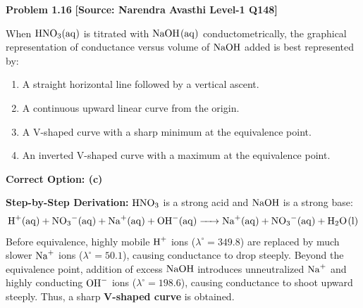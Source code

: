 \begin{problembox}
\textbf{Problem 1.16} \hfill \textbf{[Source: Narendra Avasthi Level-1 Q148]}

When $\ce{HNO3(aq)}$ is titrated with $\ce{NaOH(aq)}$ conductometrically, the graphical representation of conductance versus volume of $\ce{NaOH}$ added is best represented by:
\begin{enumerate}[label=(\alph*)]
    \item A straight horizontal line followed by a vertical ascent.
    \item A continuous upward linear curve from the origin.
    \item A V-shaped curve with a sharp minimum at the equivalence point.
    \item An inverted V-shaped curve with a maximum at the equivalence point.
\end{enumerate}
\end{problembox}
\begin{solution}
\textbf{Correct Option: (c)}

\textbf{Step-by-Step Derivation:}
$\ce{HNO3}$ is a strong acid and $\ce{NaOH}$ is a strong base:
\begin{equation*}
    \ce{H+(aq) + NO3-(aq) + Na+(aq) + OH-(aq) -> Na+(aq) + NO3-(aq) + H2O(l)}
\end{equation*}
Before equivalence, highly mobile $\ce{H+}$ ions ($\lambda^\circ = 349.8$) are replaced by much slower $\ce{Na+}$ ions ($\lambda^\circ = 50.1$), causing conductance to drop steeply. Beyond the equivalence point, addition of excess $\ce{NaOH}$ introduces unneutralized $\ce{Na+}$ and highly conducting $\ce{OH-}$ ions ($\lambda^\circ = 198.6$), causing conductance to shoot upward steeply. Thus, a sharp \textbf{V-shaped curve} is obtained.
\end{solution}

